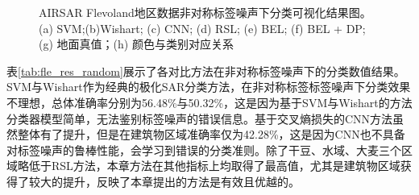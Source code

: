 \begin{figure}[ht!]

    \caption{AIRSAR Flevoland地区数据非对称标签噪声下分类可视化结果图。(a) SVM;(b)Wishart; (c) CNN; (d) RSL; (e) BEL; (f) BEL + DP; (g) 地面真值；(h) 颜色与类别对应关系}
    \label{fig:fle_random}
\end{figure}


表\ref{tab:fle_res_random}展示了各对比方法在非对称标签噪声下的分类数值结果。SVM与Wishart作为经典的极化SAR分类方法，在非对称标签标签噪声下分类效果不理想，总体准确率分别为56.48\%与50.32\%，这是因为基于SVM与Wishart的方法分类器模型简单，无法鉴别标签噪声的错误信息。基于交叉熵损失的CNN方法虽然整体有了提升，但是在建筑物区域准确率仅为42.28\%，这是因为CNN也不具备对标签噪声的鲁棒性能，会学习到错误的分类准则。除了干豆、水域、大麦三个区域略低于RSL方法，本章方法在其他指标上均取得了最高值，尤其是建筑物区域获得了较大的提升，反映了本章提出的方法是有效且优越的。

